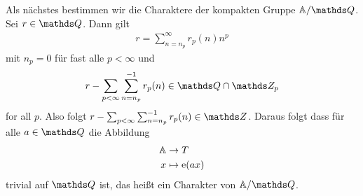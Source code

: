 Als nächstes bestimmen wir die Charaktere der kompakten Gruppe $\A/\Q$.
Sei $r\in \Q$. Dann gilt
\begin{align*}
r=\sum_{n=n_p}^\infty r_p(n)n^p
\end{align*}
mit $n_p=0$ für fast alle $p<\infty$ und
\begin{align*}
r-\sum_{p<\infty} \sum_{n=n_p}^{-1}r_p(n) \in \Q \cap \Z_p
\end{align*}
for all $p$. Also folgt $r-\sum_{p<\infty} \sum_{n=n_p}^{-1}r_p(n) \in \Z$.
Daraus folgt dass für alle $a\in \Q$ die Abbildung
\begin{align*}
\mathbb{A} &\to T\\
x &\mapsto \mathrm{e}(ax)
\end{align*}
trivial auf $\Q$ ist, das heißt ein Charakter von $\A / \Q$.


